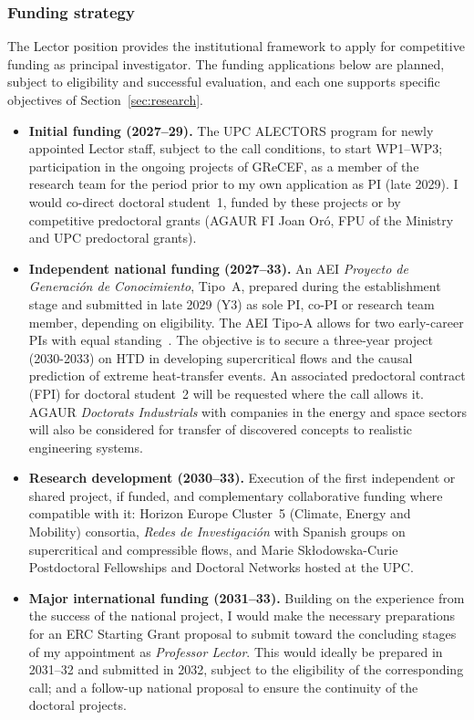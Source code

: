 \documentclass[11pt]{article}
\begin{document}
\subsubsection{Funding strategy}
The Lector position provides the institutional framework to
apply for competitive funding as principal investigator. 
The funding applications below are planned, subject to eligibility and successful evaluation, and each one supports specific objectives of Section~\ref{sec:research}.
\begin{itemize}
  \item \textbf{Initial funding (2027--29).} The UPC ALECTORS program for newly appointed Lector staff, subject to the call conditions, to start WP1--WP3; participation in the ongoing projects of GReCEF, as a member of the research team for the period prior to my own application as PI (late 2029). 
  I would co-direct doctoral student~1, funded by these projects or by competitive predoctoral grants (AGAUR FI Joan Or\'o, FPU of the Ministry and UPC predoctoral grants).
  
  \item \textbf{Independent national funding (2027--33).} An AEI \emph{Proyecto de Generaci\'on de Conocimiento}, Tipo~A, prepared during the establishment stage and submitted in late 2029 (Y3) as sole PI, co-PI or research team member, depending on eligibility. 
  The AEI Tipo-A allows for two early-career PIs with equal standing~\cite{AEI2025}. 
  The objective is to secure a three-year project (2030-2033) on HTD in developing supercritical flows and the causal prediction of extreme heat-transfer events. 
  An associated predoctoral contract (FPI) for doctoral student~2 will be requested where the call allows it. 
  AGAUR \emph{Doctorats Industrials} with companies in the energy and space sectors will also be considered for transfer of discovered concepts to realistic engineering systems.
  
  \item \textbf{Research development (2030--33).} Execution of the first independent or shared project, if funded, and complementary collaborative funding where compatible with it: Horizon Europe Cluster~5 (Climate, Energy and Mobility) consortia, \emph{Redes de Investigaci\'on}   with Spanish groups on supercritical and compressible flows, and Marie Sk\l{}odowska-Curie Postdoctoral Fellowships and Doctoral Networks hosted at the UPC.
  
  \item \textbf{Major international funding (2031--33).} Building on the experience from the success of the national project, I would make the necessary preparations for an ERC Starting Grant proposal to submit toward the concluding stages of my appointment as \textit{Professor Lector}. This would ideally be prepared in 2031--32 and submitted in 2032, subject to the eligibility of the corresponding call; and a follow-up national proposal to ensure the continuity of the doctoral projects.
\end{itemize}
\end{document}
